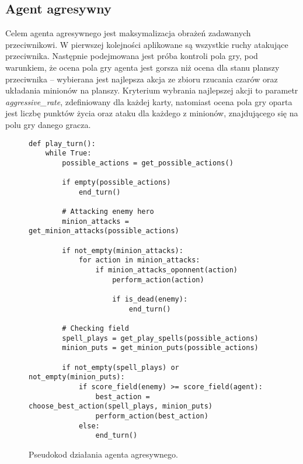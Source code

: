 \subsection{Agent agresywny}

Celem agenta agresywnego jest maksymalizacja obrażeń zadawanych przeciwnikowi. W pierwszej kolejności aplikowane są wszystkie ruchy atakujące przeciwnika. Następnie podejmowana jest próba kontroli pola gry, pod warunkiem, że ocena pola gry agenta jest gorsza niż ocena dla stanu planszy przeciwnika -- wybierana jest najlepsza akcja ze zbioru rzucania czarów oraz układania minionów na planszy. Kryterium wybrania najlepszej akcji to parametr \emph{aggressive\_rate}, zdefiniowany dla każdej karty, natomiast ocena pola gry oparta jest liczbę punktów życia oraz ataku dla każdego z minionów, znajdującego się na polu gry danego gracza.

\begin{figure}[H]
	\begin{verbatim}
def play_turn():
	while True:
		possible_actions = get_possible_actions()
		
		if empty(possible_actions)
			end_turn()
		
		# Attacking enemy hero
		minion_attacks = get_minion_attacks(possible_actions)
		
		if not_empty(minion_attacks):
			for action in minion_attacks:
				if minion_attacks_oponnent(action)
					perform_action(action)
				
					if is_dead(enemy):
						end_turn()
			
		# Checking field	
		spell_plays = get_play_spells(possible_actions)
		minion_puts = get_minion_puts(possible_actions)
				
		if not_empty(spell_plays) or not_empty(minion_puts):
			if score_field(enemy) >= score_field(agent):
				best_action = choose_best_action(spell_plays, minion_puts)
				perform_action(best_action)
			else:
				end_turn()
	\end{verbatim}
	\caption{Pseudokod działania agenta agresywnego.}
\end{figure}